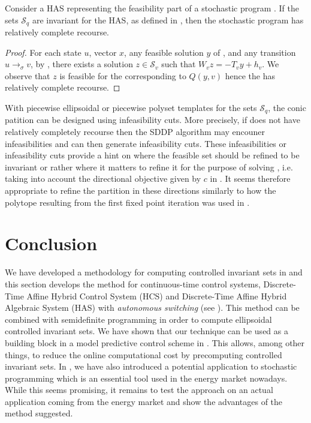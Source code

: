 \documentclass[11pt,twoside,a4paper,openright]{uclouvain-thesis}
\newcommand{\tr}{\to}
\newcommand{\trs}[1][\sigma]{\tr_{#1}}
\newcommand{\dtahcs}{HCS}
\newcommand{\dtahas}{HAS}
\begin{document}
\begin{mytheo}
  \label{theo:stoch2auton}
  Consider a \dtahas{} representing the feasibility part of a stochastic program .
  If the sets $\mathcal{S}_q$ are invariant for the \dtahas{}, as defined in ,
  then the stochastic program  has relatively complete recourse.
  \begin{proof}
    For each state $u$, vector $x$,
    any feasible solution $y$ of ,
    and any transition $u \trs v$,
    by ,
    there exists a solution $z \in \mathcal{S}_v$ such that $W_v z = -T_v y + h_v$.
    We observe that $z$ is feasible for the  corresponding to $Q(y, v)$
    hence the  has relatively complete recourse.
  \end{proof}
\end{mytheo}

\begin{myrem}
  With piecewise ellipsoidal or piecewise polyset templates for the sets $\mathcal{S}_q$,
  the conic patition can be designed using infeasibility cuts.
  More precisely, if  does not have relatively completely recourse
  then the SDDP algorithm may encouner infeasibilities and can then generate infeasibility cuts.
  These infeasibilities or infeasibility cuts provide a hint on where the feasible set
  should be refined to be invariant or rather where it matters to refine it for
  the purpose of solving , i.e. taking into account the directional
  objective given by $c$ in .
  It seems therefore appropriate to refine the partition in these directions
  similarly to how the polytope resulting from the first fixed point iteration
  was used in .
\end{myrem}




\section{Conclusion}
We have developed a methodology for computing controlled invariant sets in  and this section develops the method for continuous-time control systems, Discrete-Time Affine Hybrid Control System (\dtahcs{}) and Discrete-Time Affine Hybrid Algebraic System (\dtahas{})
with \emph{autonomous switching} (see ).
This method can be combined with semidefinite programming in order
to compute ellipsoidal controlled invariant sets.
We have shown that our technique can be used as a building block in a model predictive control scheme in .
This allows, among other things, to reduce the online computational cost by precomputing controlled invariant sets.
In , we have also introduced a potential application to stochastic programming which is an essential tool used in the energy market nowadays.
While this seems promising, it remains to test the approach on an actual application coming from the energy market and show the advantages of the method suggested.
\end{document}
